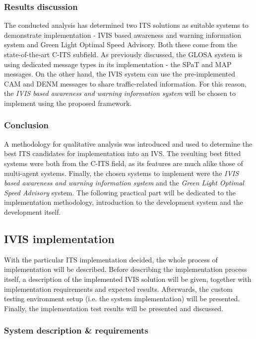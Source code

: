 \documentclass[main.tex]{subfiles}
\begin{document}
\subsubsection{Results discussion}

The conducted analysis has determined two ITS solutions as suitable systems to demonstrate 
implementation - IVIS based awareness and warning information system and Green
Light Optimal Speed Advisory. Both these come from the state-of-the-art C-ITS subfield. As 
previously discussed, the GLOSA system is using dedicated message types in its implementation -
the SPaT and MAP messages. On the other hand, the IVIS system can use the pre-implemented 
CAM and DENM messages to share traffic-related information. For this reason, the 
\emph{IVIS based awareness and warning information system} will be chosen to implement 
using the proposed framework.

\subsubsection{Conclusion}

A methodology for qualitative analysis was introduced and used to
determine the best ITS candidates for implementation into an IVS. The resulting best fitted
systems were both from the C-ITS field, as its features are much alike those of multi-agent
systems. Finally, the chosen systems to implement were the \emph{IVIS based awareness and
warning information system} and the \emph{Green Light Optimal Speed Advisory} system. The
following practical part will be dedicated to the implementation methodology, introduction to
the development system and the development itself.

\subsection{IVIS implementation}

With the particular ITS implementation decided, the whole process of implementation will be 
described. Before describing the implementation process itself, a description of the 
implemented IVIS solution will be given, together with implementation requirements and expected
results. Afterwards, the custom testing environment setup (i.e. the system implementation) will %
be presented. Finally, the implementation test results will be presented and discussed.

\subsubsection{System description \& requirements}
\end{document}
